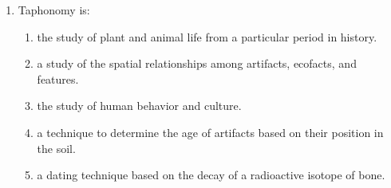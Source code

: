 \documentclass[12pt]{article}
\begin{document}
\begin{enumerate}[label=\arabic*.]
\begin{enumerate}[label=(\alph*)]
    \item soon after 60,000 years ago
    \item approximately 50,000 years ago
    \item no earlier than 100,000 years ago
    \item soon after 30,000 years ago
    \item no later than 70,000 years ago
\end{enumerate}
\item Taphonomy is:
\begin{enumerate}[label=(\alph*)]
    \item the study of plant and animal life from a particular period in history.
    \item a study of the spatial relationships among artifacts, ecofacts, and features.
    \item the study of human behavior and culture.
    \item a technique to determine the age of artifacts based on their position in the soil.
    \item a dating technique based on the decay of a radioactive isotope of bone.
\end{enumerate}
\end{enumerate}
\end{document}
